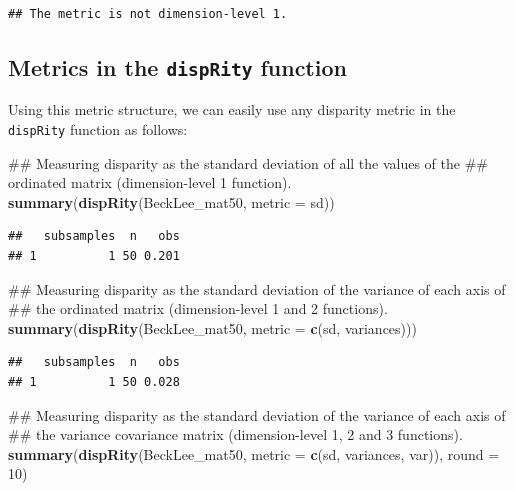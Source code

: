 \documentclass[]{book}
\newenvironment{Shaded}{\begin{snugshade}}{\end{snugshade}}
\newcommand{\KeywordTok}[1]{\textcolor[rgb]{0.13,0.29,0.53}{\textbf{#1}}}
\newcommand{\DataTypeTok}[1]{\textcolor[rgb]{0.13,0.29,0.53}{#1}}
\newcommand{\DecValTok}[1]{\textcolor[rgb]{0.00,0.00,0.81}{#1}}
\newcommand{\NormalTok}[1]{#1}
\theoremstyle{definition}
\theoremstyle{definition}
\theoremstyle{remark}
\begin{document}
\begin{verbatim}
## The metric is not dimension-level 1.
\end{verbatim}

\subsection{\texorpdfstring{Metrics in the \texttt{dispRity}
function}{Metrics in the dispRity function}}\label{metrics-in-the-disprity-function}

Using this metric structure, we can easily use any disparity metric in
the \texttt{dispRity} function as follows:

\begin{Shaded}
\begin{Highlighting}[]
\NormalTok{## Measuring disparity as the standard deviation of all the values of the}
\NormalTok{## ordinated matrix (dimension-level 1 function).}
\KeywordTok{summary}\NormalTok{(}\KeywordTok{dispRity}\NormalTok{(BeckLee_mat50, }\DataTypeTok{metric =}\NormalTok{ sd))}
\end{Highlighting}
\end{Shaded}

\begin{verbatim}
##   subsamples  n   obs
## 1          1 50 0.201
\end{verbatim}

\begin{Shaded}
\begin{Highlighting}[]
\NormalTok{## Measuring disparity as the standard deviation of the variance of each axis of}
\NormalTok{## the ordinated matrix (dimension-level 1 and 2 functions).}
\KeywordTok{summary}\NormalTok{(}\KeywordTok{dispRity}\NormalTok{(BeckLee_mat50, }\DataTypeTok{metric =} \KeywordTok{c}\NormalTok{(sd, variances)))}
\end{Highlighting}
\end{Shaded}

\begin{verbatim}
##   subsamples  n   obs
## 1          1 50 0.028
\end{verbatim}

\begin{Shaded}
\begin{Highlighting}[]
\NormalTok{## Measuring disparity as the standard deviation of the variance of each axis of}
\NormalTok{## the variance covariance matrix (dimension-level 1, 2 and 3 functions).}
\KeywordTok{summary}\NormalTok{(}\KeywordTok{dispRity}\NormalTok{(BeckLee_mat50, }\DataTypeTok{metric =} \KeywordTok{c}\NormalTok{(sd, variances, var)), }\DataTypeTok{round =} \DecValTok{10}\NormalTok{)}
\end{Highlighting}
\end{Shaded}
\end{document}
